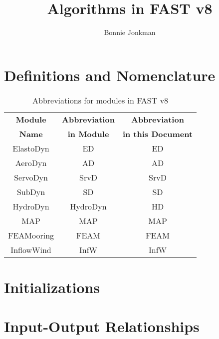 \documentclass[10pt,letterpaper,oneside,notitlepage]{article}
\begin{document}
\title{Algorithms in FAST v8}
\author{Bonnie Jonkman}
\maketitle


\section{Definitions and Nomenclature}


\begin{table}[h]
	\centering
		\begin{tabular}{c|c|c}
		\textbf{Module} & \textbf{Abbreviation} & \textbf{Abbreviation}\\
		\textbf{Name}   & \textbf{in Module}    & \textbf{in this Document}\\
		\hline 
		ElastoDyn       & ED                    & ED        \\
		AeroDyn         & AD                    & AD        \\
		ServoDyn        & SrvD                  & SrvD      \\
		SubDyn          & SD                    & SD        \\
		HydroDyn        & HydroDyn              & HD        \\
		MAP             & MAP                   & MAP       \\
		FEAMooring      & FEAM                  & FEAM      \\
		InflowWind      & InfW                  & InfW      \\   
		\end{tabular}
	\caption{Abbreviations for modules in FAST v8}
	\label{tab:Abbrev}
\end{table}


\printnomenclature

\section{Initializations}


\pagebreak %
\section{Input-Output Relationships}
\end{document}
